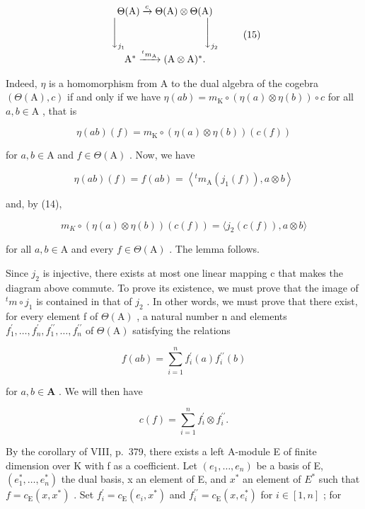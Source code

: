 \[
\begin{array}{c} \Theta (\mathrm{A}) \xrightarrow {c} \Theta (\mathrm{A}) \otimes \Theta (\mathrm{A}) \\ \Biggl \downarrow_ {j _ {1}} \qquad \qquad \qquad \qquad \Biggl \downarrow_ {j _ {2}} \\ \mathrm{A} ^ {*} \xrightarrow {^ t m _ {\mathrm{A}}} (\mathrm{A} \otimes \mathrm{A}) ^ {*}. \end{array}\tag{15}
\]

Indeed, \(\eta\) is a homomorphism from A to the dual algebra of the cogebra \((\Theta (\mathrm{A}),c)\) if and only if we have \(\eta (ab) = m_{\mathrm{K}}\circ (\eta (a)\otimes \eta (b))\circ c\) for all \(a,b\in \mathrm{A}\) , that is

\[
\eta (a b) (f) = m _ {\mathrm{K}} \circ (\eta (a) \otimes \eta (b)) (c (f))
\]

for \(a, b \in \mathrm{A}\) and \(f \in \Theta(\mathrm{A})\) . Now, we have

\[
\eta (a b) (f) = f (a b) = \left\langle {} ^ {t} m _ {\mathrm{A}} \left(j _ {1} (f)\right), a \otimes b \right\rangle
\]

and, by (14),

\[
m _ {K} \circ (\eta (a) \otimes \eta (b)) (c (f)) = \langle j _ {2} (c (f)), a \otimes b \rangle
\]

for all \(a, b \in \mathrm{A}\) and every \(f \in \Theta(\mathrm{A})\) . The lemma follows.

Since \(j_{2}\) is injective, there exists at most one linear mapping c that makes the diagram above commute. To prove its existence, we must prove that the image of \(^{t}m \circ j_{1}\) is contained in that of \(j_{2}\) . In other words, we must prove that there exist, for every element f of \(\Theta(\mathrm{A})\) , a natural number n and elements \(f_{1}^{\prime}, \ldots, f_{n}^{\prime}, f_{1}^{\prime\prime}, \ldots, f_{n}^{\prime\prime}\) of \(\Theta(\mathrm{A})\) satisfying the relations

\[
f (a b) = \sum_ {i = 1} ^ {n} f _ {i} ^ {\prime} (a) f _ {i} ^ {\prime \prime} (b)\tag{16}
\]

for \(a, b \in \mathbf{A}\) . We will then have

\[
c (f) = \sum_ {i = 1} ^ {n} f _ {i} ^ {\prime} \otimes f _ {i} ^ {\prime \prime}.\tag{17}
\]

By the corollary of VIII, p.~379, there exists a left A-module E of finite dimension over K with f as a coefficient. Let \((e_{1},\ldots,e_{n})\) be a basis of E, \((e_{1}^{*},\ldots,e_{n}^{*})\) the dual basis, x an element of E, and \(x^{*}\) an element of \(E^{*}\) such that \(f=c_{\mathrm{E}}(x,x^{*})\) . Set \(f_{i}^{\prime}=c_{\mathrm{E}}(e_{i},x^{*})\) and \(f_{i}^{\prime\prime}=c_{\mathrm{E}}(x,e_{i}^{*})\) for \(i\in[1,n]\) ; for

